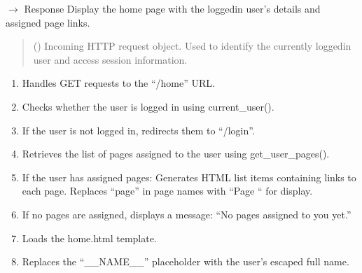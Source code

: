 \documentclass[letterpaper,10pt,english]{sphinxmanual}
\begin{document}
\begin{fulllineitems}
\label{\detokenize{modules:app.auth.home}}
\pysigstartsignatures
\pysiglinewithargsret
{}
{}
{{ $\rightarrow$ Response}}
\pysigstopsignatures
\sphinxAtStartPar
Display the home page with the logged\sphinxhyphen{}in user’s details
and assigned page links.
\begin{quote}\begin{description}
\sphinxAtStartPar
{} () \textendash{} Incoming HTTP request object.
Used to identify the currently logged\sphinxhyphen{}in user
and access session information.

\end{description}\end{quote}
\begin{description}
\begin{enumerate}
%
\item {} 
\sphinxAtStartPar
Handles GET requests to the “/home” URL.

\item {} 
\sphinxAtStartPar
Checks whether the user is logged in using current\_user().

\item {} 
\sphinxAtStartPar
If the user is not logged in, redirects them to “/login”.

\item {} 
\sphinxAtStartPar
Retrieves the list of pages assigned to the user
using get\_user\_pages().

\item {} 
\sphinxAtStartPar
If the user has assigned pages:
\sphinxhyphen{} Generates HTML list items containing links to each page.
\sphinxhyphen{} Replaces “page” in page names with “Page “ for display.

\item {} 
\sphinxAtStartPar
If no pages are assigned, displays a message:
“No pages assigned to you yet.”

\item {} 
\sphinxAtStartPar
Loads the home.html template.

\item {} 
\sphinxAtStartPar
Replaces the “\_\_NAME\_\_” placeholder with the user’s
escaped full name.


\end{enumerate}
\end{description}
\end{fulllineitems}
\end{document}
